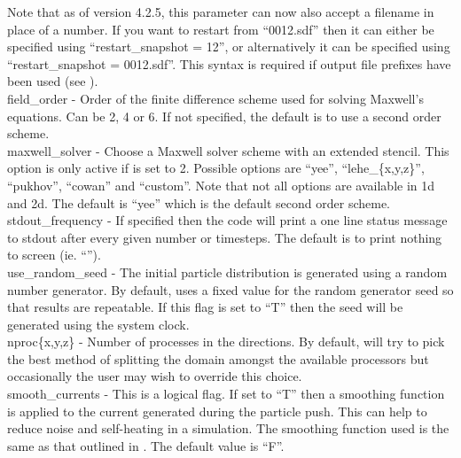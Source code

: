 Note that as of version 4.2.5, this parameter can now also accept a filename
in place of a number.
If you want to restart from ``0012.sdf'' then it can either be
specified using ``restart\_snapshot = 12'', or alternatively it can be
specified using ``restart\_snapshot = 0012.sdf''. This syntax is required
if output file prefixes have been used (see ).\\

{\emphtext field\_order} - Order of the finite difference scheme used for
solving Maxwell's equations. Can be 2, 4 or 6. If not specified, the default
is to use a second order scheme.\\

{\emphtext maxwell\_solver} - Choose a Maxwell solver scheme with an extended
stencil. This option is only active if  is set to 2.
Possible options are ``yee'', ``lehe\_\{x,y,z\}'', ``pukhov'', ``cowan''
and ``custom''.
Note that
not all options are available in 1d and 2d. The default is ``yee'' which is the
default second order scheme.\\

{\emphtext stdout\_frequency} - If specified then the code will print a one
line status message to stdout after every given number or timesteps. The
default is to print nothing to screen (ie. ``'').\\

{\emphtext use\_random\_seed} - The initial particle distribution is
generated using a random number generator. By default, {\EPOCH} uses a fixed
value for the random generator seed so that results are repeatable. If this
flag is set to ``T'' then the seed will be generated using the system clock.\\

{\emphtext nproc\{x,y,z\}} - Number of processes in the 
directions. By default, {\EPOCH} will try to pick the best method of splitting
the domain amongst the available processors but occasionally the user may
wish to override this choice.\\

{\emphtext smooth\_currents} - This is a logical flag. If set to ``T'' then
a smoothing function is applied to the current generated during the particle
push. This can help to reduce noise and self-heating in a simulation. The
smoothing function used is the same as that outlined in \citet{Buneman}.
The default value is ``F''.\\

